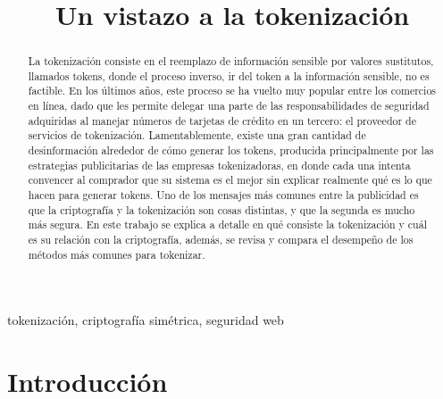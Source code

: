 \documentclass[conference]{IEEEtran}
\begin{document}
  \title{Un vistazo a la tokenización}

  \author{%
    }

  \maketitle

  \begin{abstract}
    La tokenización consiste en el reemplazo de información sensible por valores
    sustitutos, llamados tokens, donde el proceso inverso, ir del  token a la
    información sensible, no es factible. En los últimos años, este proceso se
    ha vuelto muy popular entre los comercios en línea, dado que les permite
    delegar una parte de las responsabilidades de seguridad adquiridas al
    manejar números de tarjetas de crédito en un tercero: el proveedor de
    servicios de tokenización.
    Lamentablemente, existe una gran cantidad de desinformación alrededor de
    cómo generar los tokens, producida principalmente por las estrategias
    publicitarias de las empresas tokenizadoras, en donde cada una intenta
    convencer al comprador que su sistema es el mejor sin explicar realmente
    qué es lo que hacen para generar tokens. Uno de los mensajes más comunes
    entre la publicidad es que la criptografía y la tokenización son cosas
    distintas, y que la segunda es mucho más segura. En este trabajo se
    explica a detalle en qué consiste la tokenización y cuál es su relación con
    la criptografía, además, se revisa y compara el desempeño de los métodos más
    comunes para tokenizar.
  \end{abstract}

  \begin{IEEEkeywords}
    tokenización, criptografía simétrica, seguridad web
  \end{IEEEkeywords}

  \section{Introducción}
\end{document}
